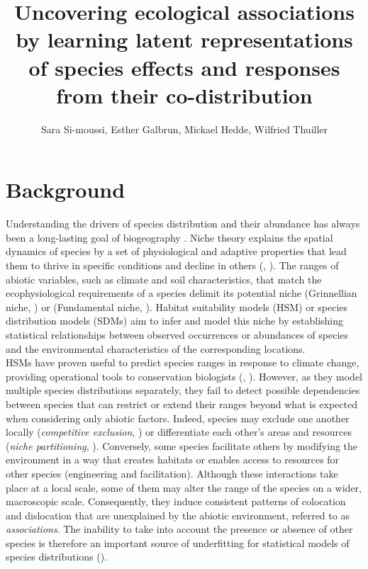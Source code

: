 \documentclass[10pt,a4paper]{article}
\title{Uncovering ecological associations by learning latent representations of species effects and responses from their co-distribution}
\author{Sara Si-moussi, Esther Galbrun, Mickael Hedde, Wilfried Thuiller}
\begin{document}
\maketitle

\section{Background}
Understanding the drivers of species distribution and their abundance has always been a long-lasting goal of biogeography \cite{humboldt1805essai}. Niche theory explains the spatial dynamics of species by a set of physiological and adaptive properties that lead them to thrive in specific conditions and decline in others (\cite{chase2003ecological}, \cite{pulliam2000relationship}). The ranges of abiotic variables, such as climate and soil characteristics, that match the ecophysiological requirements of a species delimit its potential niche (Grinnellian niche, \cite{grinnell1917niche}) or (Fundamental niche, \cite{hutchinson1957multivariate}).  Habitat suitability models (HSM) or species distribution models (SDMs) \cite{guisan2017habitat} aim to infer and model this niche by establishing statistical relationships between observed occurrences or abundances of species and the environmental characteristics of the corresponding locations. \\

HSMs have proven useful to predict species ranges in response to climate change, providing operational tools to conservation biologists (\cite{guisan2005predicting}, \cite{elith2009species}). However, as they model multiple species distributions separately, they fail to detect possible dependencies between species that can restrict or extend their ranges beyond what is expected when considering only abiotic factors.  Indeed, species may exclude one another locally (\textit{competitive exclusion}, \cite{hardin1960competitive}) or differentiate each other’s areas and resources (\textit{niche partitioning}, \cite{schoener1974resource}). Conversely, some species facilitate others by modifying the environment in a way that creates habitats or enables access to resources for other species (engineering and facilitation). Although these interactions take place at a local scale, some of them may alter the range of the species on a wider, macroscopic scale. Consequently, they induce consistent patterns of colocation and dislocation that are unexplained by the abiotic environment, referred to as \emph{associations}. The inability to take into account the presence or absence of other species is therefore an important source of underfitting for statistical models of species distributions (\cite{wisz2013role}). \\
\end{document}
